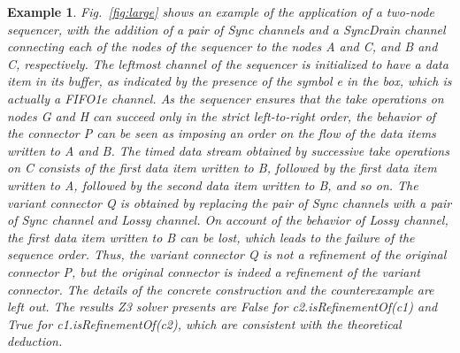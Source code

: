 \documentclass[preprint,3p]{elsarticle}
\newtheorem{example}{Example}[section]
\begin{document}
\begin{example}
Fig.~\ref{fig:large} shows an example of the application of a two-node sequencer, with the addition of a pair of \emph{Sync} channels and a \emph{SyncDrain} channel connecting each of the nodes of the sequencer to the nodes
\emph{A} and \emph{C}, and \emph{B} and \emph{C}, respectively. The leftmost channel of the sequencer is initialized to have a data item in its buffer, as indicated by the presence of the symbol \emph{e} in the box, which is actually a \emph{FIFO1e} channel. As the sequencer ensures that the take operations on nodes \emph{G} and \emph{H} can succeed only in the strict left-to-right order, the behavior of the connector \emph{P} can be seen as imposing an order on the flow of the data items written to \emph{A} and \emph{B}. The timed data stream obtained by successive take operations on \emph{C} consists of the first data item written to \emph{B}, followed by the first data item written to \emph{A}, followed by the second data item written to \emph{B}, and so on. The variant connector \emph{Q} is obtained by replacing the pair of \emph{Sync} channels with a pair of \emph{Sync} channel and \emph{Lossy} channel. On account of the behavior of \emph{Lossy} channel, the first data item written to \emph{B} can be lost, which leads to the failure of the sequence order. Thus, the variant connector \emph{Q} is not a refinement of the original connector \emph{P}, but the original connector is indeed a refinement of the variant connector. The details of the concrete construction and the counterexample are left out. The results Z3 solver presents are \emph{False} for \emph{c2.isRefinementOf(c1)} and \emph{True} for \emph{c1.isRefinementOf(c2)}, which are consistent with the theoretical deduction.
\begin{figure}
\centering
{}
\end{figure}
\end{example}
\end{document}

